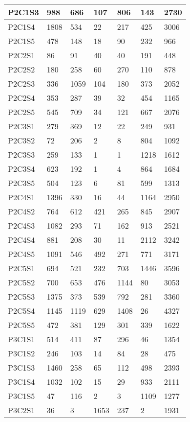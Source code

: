 \begin{longtable}{|l|l|l|l|l|l|l|}
P2C1S3 & 988 & 686 & 107 & 806 & 143 & 2730 \\ \hline
P2C1S4 & 1808 & 534 & 22 & 217 & 425 & 3006 \\ \hline
P2C1S5 & 478 & 148 & 18 & 90 & 232 & 966 \\ \hline
P2C2S1 & 86 & 91 & 40 & 40 & 191 & 448 \\ \hline
P2C2S2 & 180 & 258 & 60 & 270 & 110 & 878 \\ \hline
P2C2S3 & 336 & 1059 & 104 & 180 & 373 & 2052 \\ \hline
P2C2S4 & 353 & 287 & 39 & 32 & 454 & 1165 \\ \hline
P2C2S5 & 545 & 709 & 34 & 121 & 667 & 2076 \\ \hline
P2C3S1 & 279 & 369 & 12 & 22 & 249 & 931 \\ \hline
P2C3S2 & 72 & 206 & 2 & 8 & 804 & 1092 \\ \hline
P2C3S3 & 259 & 133 & 1 & 1 & 1218 & 1612 \\ \hline
P2C3S4 & 623 & 192 & 1 & 4 & 864 & 1684 \\ \hline
P2C3S5 & 504 & 123 & 6 & 81 & 599 & 1313 \\ \hline
P2C4S1 & 1396 & 330 & 16 & 44 & 1164 & 2950 \\ \hline
P2C4S2 & 764 & 612 & 421 & 265 & 845 & 2907 \\ \hline
P2C4S3 & 1082 & 293 & 71 & 162 & 913 & 2521 \\ \hline
P2C4S4 & 881 & 208 & 30 & 11 & 2112 & 3242 \\ \hline
P2C4S5 & 1091 & 546 & 492 & 271 & 771 & 3171 \\ \hline
P2C5S1 & 694 & 521 & 232 & 703 & 1446 & 3596 \\ \hline
P2C5S2 & 700 & 653 & 476 & 1144 & 80 & 3053 \\ \hline
P2C5S3 & 1375 & 373 & 539 & 792 & 281 & 3360 \\ \hline
P2C5S4 & 1145 & 1119 & 629 & 1408 & 26 & 4327 \\ \hline
P2C5S5 & 472 & 381 & 129 & 301 & 339 & 1622 \\ \hline
P3C1S1 & 514 & 411 & 87 & 296 & 46 & 1354 \\ \hline
P3C1S2 & 246 & 103 & 14 & 84 & 28 & 475 \\ \hline
P3C1S3 & 1460 & 258 & 65 & 112 & 498 & 2393 \\ \hline
P3C1S4 & 1032 & 102 & 15 & 29 & 933 & 2111 \\ \hline
P3C1S5 & 47 & 116 & 2 & 3 & 1109 & 1277 \\ \hline
P3C2S1 & 36 & 3 & 1653 & 237 & 2 & 1931 \\ \hline

\end{longtable}
